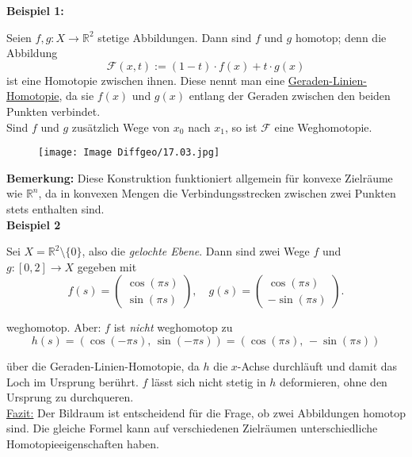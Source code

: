 \documentclass[fleqn, 12pt, letterpaper]{article}
\begin{document}
\textbf{Beispiel 1:}

Seien \( f, g : X \to \mathbb{R}^2 \) stetige Abbildungen. Dann sind \( f \) und \( g \) {homotop}; denn die Abbildung
\[
\mathcal{F}(x,t) := (1 - t) \cdot f(x) + t \cdot g(x)
\]
ist eine Homotopie zwischen ihnen.
Diese nennt man eine \underline{Geraden-Linien-Homotopie}, da sie \( f(x) \) und \( g(x) \) entlang der Geraden zwischen den beiden Punkten verbindet.\\

Sind \( f \) und \( g \) zusätzlich Wege von \( x_0 \) nach \( x_1 \), so ist \( \mathcal{F} \) eine {Weghomotopie}.\\
  \begin{figure}[H]
    \centering
    \texttt{[image: Image Diffgeo/17.03.jpg]}
 \end{figure}

\textbf{Bemerkung:} Diese Konstruktion funktioniert allgemein für konvexe Zielräume wie \( \mathbb{R}^n \), da in konvexen Mengen die Verbindungsstrecken zwischen zwei Punkten stets enthalten sind.\\

\textbf{Beispiel 2}

Sei \( X = \mathbb{R}^2 \setminus \{0\} \), also die \emph{gelochte Ebene}. Dann sind zwei Wege \( f \) und \( g : [0,2] \to X \) gegeben mit
\[
f(s) = 
\begin{pmatrix}
\cos(\pi s) \\
\sin(\pi s)
\end{pmatrix},
\quad
g(s) = 
\begin{pmatrix}
\cos(\pi s) \\
-\sin(\pi s)
\end{pmatrix}.
\]

{weghomotop}. Aber: \( f \) ist \emph{nicht} weghomotop zu
\[h(s) = \left( \cos(-\pi s),\, \sin(-\pi s) \right) = \left( \cos(\pi s),\, -\sin(\pi s) \right)\]

über die Geraden-Linien-Homotopie, da \( h \) die $x$-Achse durchläuft und damit das Loch im Ursprung berührt. \( f \) lässt sich nicht stetig in \( h \) deformieren, ohne den Ursprung zu durchqueren.\\

\underline{Fazit:} Der {Bildraum} ist entscheidend für die Frage, ob zwei Abbildungen homotop sind. Die gleiche Formel kann auf verschiedenen Zielräumen unterschiedliche Homotopieeigenschaften haben.\\
\end{document}
